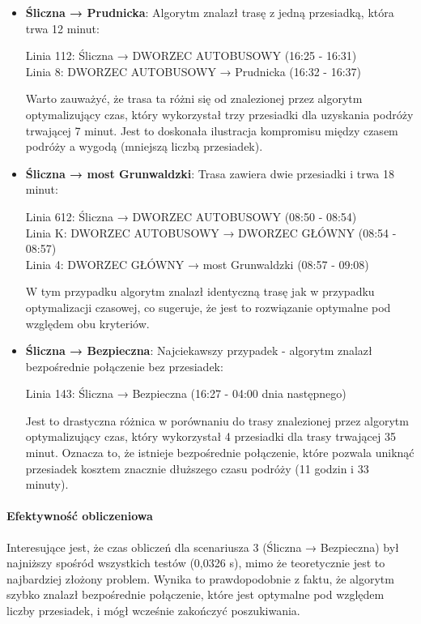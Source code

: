 \documentclass[12pt,a4paper]{article}
\begin{document}
\begin{itemize}
    \item \textbf{Śliczna → Prudnicka}: Algorytm znalazł trasę z jedną przesiadką, która trwa 12 minut:
    \begin{center}
    Linia 112: Śliczna → DWORZEC AUTOBUSOWY (16:25 - 16:31) \\
    Linia 8: DWORZEC AUTOBUSOWY → Prudnicka (16:32 - 16:37)
    \end{center}
    
    Warto zauważyć, że trasa ta różni się od znalezionej przez algorytm optymalizujący czas, który wykorzystał trzy przesiadki dla uzyskania podróży trwającej 7 minut. Jest to doskonała ilustracja kompromisu między czasem podróży a wygodą (mniejszą liczbą przesiadek).
    
    \item \textbf{Śliczna → most Grunwaldzki}: Trasa zawiera dwie przesiadki i trwa 18 minut:
    \begin{center}
    Linia 612: Śliczna → DWORZEC AUTOBUSOWY (08:50 - 08:54) \\
    Linia K: DWORZEC AUTOBUSOWY → DWORZEC GŁÓWNY (08:54 - 08:57) \\
    Linia 4: DWORZEC GŁÓWNY → most Grunwaldzki (08:57 - 09:08)
    \end{center}
    
    W tym przypadku algorytm znalazł identyczną trasę jak w przypadku optymalizacji czasowej, co sugeruje, że jest to rozwiązanie optymalne pod względem obu kryteriów.
    
    \item \textbf{Śliczna → Bezpieczna}: Najciekawszy przypadek - algorytm znalazł bezpośrednie połączenie bez przesiadek:
    \begin{center}
    Linia 143: Śliczna → Bezpieczna (16:27 - 04:00 dnia następnego)
    \end{center}
    
    Jest to drastyczna różnica w porównaniu do trasy znalezionej przez algorytm optymalizujący czas, który wykorzystał 4 przesiadki dla trasy trwającej 35 minut. Oznacza to, że istnieje bezpośrednie połączenie, które pozwala uniknąć przesiadek kosztem znacznie dłuższego czasu podróży (11 godzin i 33 minuty).
\end{itemize}

\paragraph{Efektywność obliczeniowa}
Interesujące jest, że czas obliczeń dla scenariusza 3 (Śliczna → Bezpieczna) był najniższy spośród wszystkich testów (0,0326 s), mimo że teoretycznie jest to najbardziej złożony problem. Wynika to prawdopodobnie z faktu, że algorytm szybko znalazł bezpośrednie połączenie, które jest optymalne pod względem liczby przesiadek, i mógł wcześnie zakończyć poszukiwania.
\end{document}
